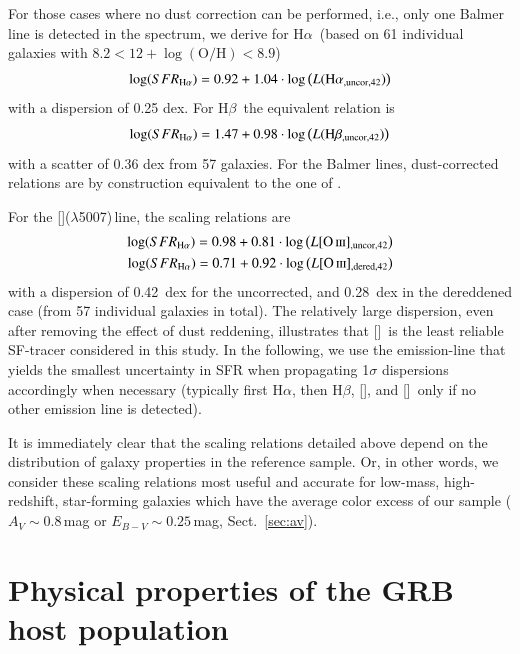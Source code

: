 \documentclass[traditabstract, longauth]{aa}
\newcommand{\hb}{H$\beta$}
\newcommand{\ha}{H$\alpha$}
\newcommand{\oh}{12+\log(\mathrm{O/H})}
\newcommand{\oii}{[\ion{O}{ii}]}
\newcommand{\oiii}{[\ion{O}{iii}]}
\begin{document}
For those cases where no dust correction can be performed, i.e., only one Balmer line is detected in the spectrum, we derive for \ha\, (based on 61 individual galaxies with $8.2 < \oh < 8.9$)
\begin{equation}
\log({SFR_{\rm{H}\alpha}}) = 0.92 + 1.04\cdot\log\left(L({\rm{H}\alpha_{\rm{,uncor,42}}})\right)
\end{equation}
with a dispersion of 0.25 dex. For \hb\, the equivalent relation is
\begin{equation}
\log({SFR_{\rm{H}\alpha}}) = 1.47 + 0.98\cdot\log\left(L({\rm{H}\beta_{\rm{,uncor,42}}})\right)
\end{equation}
with a scatter of 0.36 dex from 57 galaxies. For the Balmer lines, dust-corrected relations are by construction equivalent to the one of \citet{1998ARA&A..36..189K}.

For the \oiii($\lambda$5007)\,line, the scaling relations are
\begin{equation}
\begin{split}
\log({SFR_{\rm{H}\alpha}}) = 0.98 + 0.81\cdot\log\left(L{\oiii_{\rm{,uncor,42}}}\right)\\
\log({SFR_{\rm{H}\alpha}}) = 0.71 + 0.92\cdot\log\left(L{\oiii_{\rm{,dered,42}}}\right)
\end{split}
\end{equation}
with a dispersion of 0.42~dex for the uncorrected, and 0.28~dex in the dereddened case (from 57 individual galaxies in total).  {The relatively large dispersion, even after removing the effect of dust reddening, illustrates that \oiii\, is the least reliable SF-tracer considered in this study.} In the following, we use the emission-line that yields the smallest uncertainty in SFR when propagating 1$\sigma$ dispersions accordingly when necessary (typically first \ha, then \hb, \oii, and \oiii\, only if no other emission line is detected).

It is immediately clear that the scaling relations detailed above depend on the distribution of galaxy properties in the reference sample. Or, in other words, we consider these scaling relations most useful and accurate for low-mass, high-redshift, star-forming galaxies which have the average color excess of our sample ($A_V\sim0.8$\,mag or $E_{B-V}\sim0.25$\,mag, Sect.~\ref{sec:av}).

\section{Physical properties of the GRB host population}
\label{sec:prop}
\end{document}
